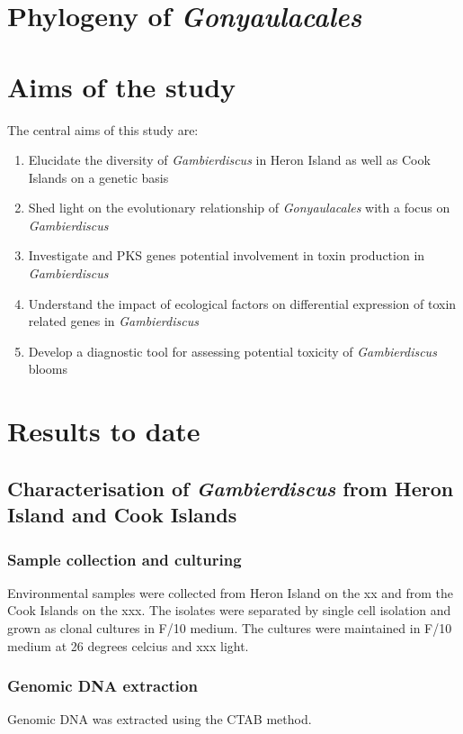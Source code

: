\documentclass[12pt]{article}
\begin{document}
\section{Phylogeny of \emph{Gonyaulacales}}

\section{Aims of the study}
The central aims of this study are:
\begin{enumerate}
\item Elucidate the diversity of \emph{Gambierdiscus} in Heron Island as well as Cook Islands on a genetic basis
\item Shed light on the evolutionary relationship of \emph{Gonyaulacales} with a focus on \emph{Gambierdiscus}
\item Investigate and PKS genes potential involvement in toxin production in \emph{Gambierdiscus}
\item Understand the impact of ecological factors on differential expression of toxin related genes in \emph{Gambierdiscus}
\item Develop a diagnostic tool for assessing potential toxicity of \emph{Gambierdiscus} blooms
\end{enumerate}

\section{Results to date}

\subsection{Characterisation of \emph{Gambierdiscus} from Heron Island and Cook Islands}

\subsubsection{Sample collection and culturing}
Environmental samples were collected from Heron Island on the xx and from the Cook Islands on the xxx.
The isolates were separated by single cell isolation and grown as clonal cultures in F/10 medium. The cultures were maintained in F/10 medium at 26 degrees celcius and xxx light.

\subsubsection{Genomic DNA extraction}
Genomic DNA was extracted using the CTAB method.
\end{document}
